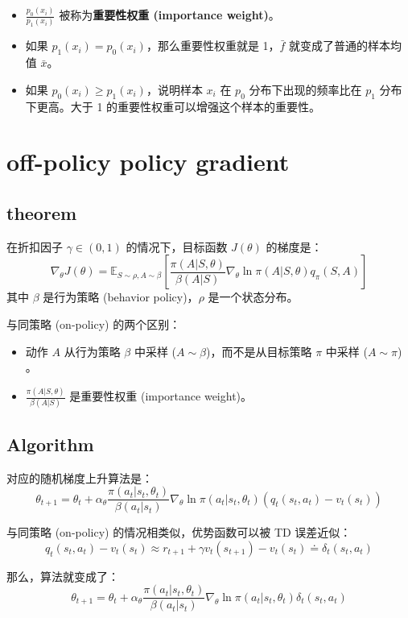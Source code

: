 \documentclass{article}
\begin{document}
\begin{itemize}
    \item $\frac{p_0(x_i)}{p_1(x_i)}$ 被称为\textbf{重要性权重 (importance weight)}。
    \item 如果 $p_1(x_i) = p_0(x_i)$，那么重要性权重就是 1，$\bar{f}$ 就变成了普通的样本均值 $\bar{x}$。
    \item 如果 $p_0(x_i) \ge p_1(x_i)$，说明样本 $x_i$ 在 $p_0$ 分布下出现的频率比在 $p_1$ 分布下更高。大于 1 的重要性权重可以增强这个样本的重要性。
\end{itemize}

\section{off-policy policy gradient}
\subsection{theorem}

在折扣因子 $\gamma \in (0, 1)$ 的情况下，目标函数 $J(\theta)$ 的梯度是：
\[
\nabla_{\theta} J(\theta) = \mathbb{E}_{S \sim \rho, A \sim \beta} \left[ \frac{\pi(A|S, \theta)}{\beta(A|S)} \nabla_{\theta} \ln \pi(A|S, \theta) q_{\pi}(S, A) \right]
\]
其中 $\beta$ 是行为策略 (behavior policy)，$\rho$ 是一个状态分布。


与同策略 (on-policy) 的两个区别：
\begin{itemize}
    \item 动作 $A$ 从行为策略 $\beta$ 中采样 ($A \sim \beta$)，而不是从目标策略 $\pi$ 中采样 ($A \sim \pi$) 。
    \item $\frac{\pi(A|S, \theta)}{\beta(A|S)}$ 是重要性权重 (importance weight)。
\end{itemize}
\subsection{Algorithm}

对应的随机梯度上升算法是：
\[
\theta_{t+1} = \theta_t + \alpha_{\theta} \frac{\pi(a_t|s_t, \theta_t)}{\beta(a_t|s_t)} \nabla_{\theta} \ln \pi(a_t|s_t, \theta_t) (q_t(s_t, a_t) - v_t(s_t))
\]

与同策略 (on-policy) 的情况相类似，优势函数可以被 TD 误差近似：
\[
q_t(s_t, a_t) - v_t(s_t) \approx r_{t+1} + \gamma v_t(s_{t+1}) - v_t(s_t) \doteq \delta_t(s_t, a_t)
\]

那么，算法就变成了：
\[
\theta_{t+1} = \theta_t + \alpha_{\theta} \frac{\pi(a_t|s_t, \theta_t)}{\beta(a_t|s_t)} \nabla_{\theta} \ln \pi(a_t|s_t, \theta_t) \delta_t(s_t, a_t)
\]
\end{document}
